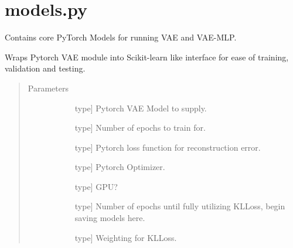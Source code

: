 \documentclass[letterpaper,10pt,english]{sphinxmanual}
\begin{document}
\label{\detokenize{index:module-methylnet.models}}

\chapter{models.py}
\label{\detokenize{index:models-py}}
Contains core PyTorch Models for running VAE and VAE-MLP.

\begin{fulllineitems}
\label{\detokenize{index:methylnet.models.AutoEncoder}}
Wraps Pytorch VAE module into Scikit-learn like interface for ease of training, validation and testing.
\begin{quote}\begin{description}
\item[{Parameters}] \leavevmode\begin{description}
\item[{}] \leavevmode{[}type{]}
Pytorch VAE Model to supply.

\item[{}] \leavevmode{[}type{]}
Number of epochs to train for.

\item[{}] \leavevmode{[}type{]}
Pytorch loss function for reconstruction error.

\item[{}] \leavevmode{[}type{]}
Pytorch Optimizer.

\item[{}] \leavevmode{[}type{]}
GPU?

\item[{}] \leavevmode{[}type{]}
Number of epochs until fully utilizing KLLoss, begin saving models here.

\item[{}] \leavevmode{[}type{]}
Weighting for KLLoss.


\end{description}
\end{description}
\end{quote}
\end{fulllineitems}
\end{document}
